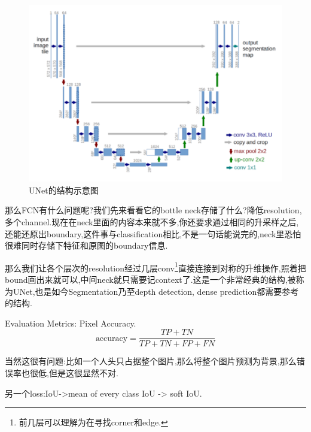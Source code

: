 \begin{figure}
	\includegraphics[scale=0.4]{figures/UNetstructure.png}
	\caption{UNet的结构示意图}
\end{figure}

那么FCN有什么问题呢?我们先来看看它的bottle neck存储了什么?降低resolution,多个channel.现在在neck里面的内容本来就不多,你还要求通过相同的升采样之后,还能还原出boundary,这件事与classification相比,不是一句话能说完的,neck里恐怕很难同时存储下特征和原图的boundary信息.


那么我们让各个层次的resolution经过几层conv\footnote{前几层可以理解为在寻找corner和edge.}直接连接到对称的升维操作,照着把bound画出来就可以,中间neck就只需要记context了.这是一个非常经典的结构,被称为UNet,也是如今Segmentation乃至depth detection, dense prediction都需要参考的结构.

Evaluation Metrics: Pixel Accuracy.
\begin{equation}
	\text{accuracy} = \frac{TP+TN}{TP+TN+FP+FN}
\end{equation}

当然这很有问题:比如一个人头只占据整个图片,那么将整个图片预测为背景,那么错误率也很低,但是这很显然不对.

另一个loss:IoU->mean of every class IoU -> soft IoU.